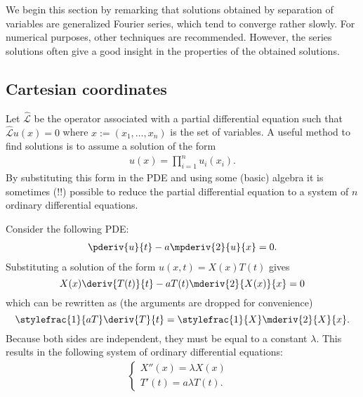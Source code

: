     \begin{remark*}
        We begin this section by remarking that solutions obtained by separation of variables are generalized Fourier series, which tend to converge rather slowly. For numerical purposes, other techniques are recommended. However, the series solutions often give a good insight in the properties of the obtained solutions.
    \end{remark*}

\subsection{Cartesian coordinates}

    \begin{method}
        Let $\hat{\mathcal{L}}$ be the operator associated with a partial differential equation such that $\hat{\mathcal{L}}u(x)=0$ where $x := (x_1,\ldots,x_n)$ is the set of variables. A useful method to find solutions is to assume a solution of the form
        \begin{gather}
            u(x) = \prod_{i=1}^nu_i(x_i).
        \end{gather}
        By substituting this form in the PDE and using some (basic) algebra it is sometimes (!!) possible to reduce the partial differential equation to a system of $n$ ordinary differential equations.
    \end{method}

    \begin{example}
        Consider the following PDE:
        \begin{gather}
            \pderiv{u}{t} - a\mpderiv{2}{u}{x} = 0.
        \end{gather}
        Substituting a solution of the form $u(x,t) = X(x)T(t)$ gives \[X(x)\deriv{T(t)}{t} - aT(t)\mderiv{2}{X(x)}{x} = 0\] which can be rewritten as (the arguments are dropped for convenience) \[\stylefrac{1}{aT}\deriv{T}{t} = \stylefrac{1}{X}\mderiv{2}{X}{x}.\] Because both sides are independent, they must be equal to a constant $\lambda$. This results in the following system of ordinary differential equations:
        \begin{gather}
            \begin{cases}
                X''(x) = \lambda X(x)&\\
                T'(t) = a\lambda T(t).&
            \end{cases}
        \end{gather}
    \end{example}

